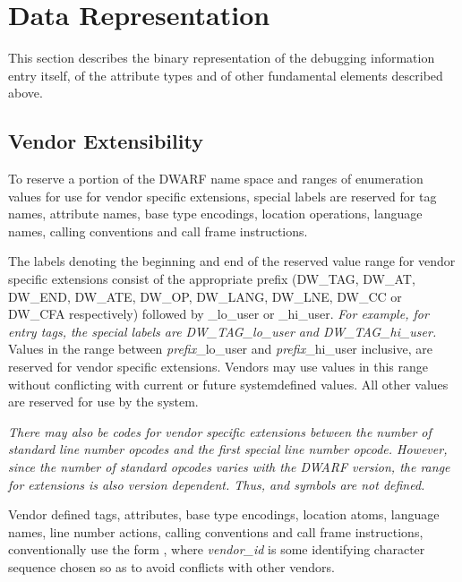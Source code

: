 \chapter{Data Representation}
\label{datarep:datarepresentation}

This section describes the binary representation of the
debugging information entry itself, of the attribute types
and of other fundamental elements described above.


\section{Vendor Extensibility}
\label{datarep:vendorextensibility}

To 
reserve a portion of the DWARF name space and ranges of
enumeration values for use for vendor specific extensions,
special labels are reserved for tag names, attribute names,
base type encodings, location operations, language names,
calling conventions and call frame instructions.

The labels denoting the beginning and end of the reserved
value range for vendor specific extensions consist of the
appropriate prefix (DW\_TAG, DW\_AT, DW\_END, DW\_ATE, DW\_OP,
DW\_LANG, DW\_LNE, DW\_CC or DW\_CFA respectively) followed by
\_lo\_user or \_hi\_user. 
\textit{For example, for entry tags, the special
labels are DW\_TAG\_lo\_user and DW\_TAG\_hi\_user.}
Values in the  range between \textit{prefix}\_lo\_user 
and \textit{prefix}\_hi\_user inclusive,
are reserved for vendor specific extensions. Vendors may
use values in this range without conflicting with current or
future system\dash defined values. All other values are reserved
for use by the system.

\textit{There may also be codes for vendor specific extensions
between the number of standard line number opcodes and
the first special line number opcode. However, since the
number of standard opcodes varies with the DWARF version,
the range for extensions is also version dependent. Thus,
 and 
 symbols are not defined.
}

Vendor defined tags, attributes, base type encodings, location
atoms, language names, line number actions, calling conventions
and call frame instructions, conventionally use the form
, where 
\textit{vendor\_id} is some identifying
character sequence chosen so as to avoid conflicts with
other vendors.


